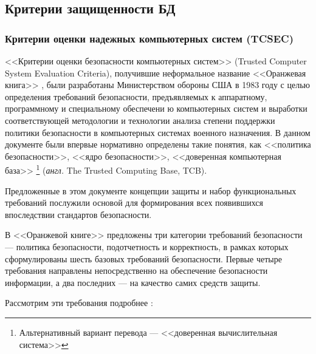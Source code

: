 \subsection{Критерии защищенности БД}

\subsubsection{Критерии оценки надежных компьютерных систем (TCSEC)}
<<Критерии оценки безопасности компьютерных систем>> (Trusted Computer System Evaluation Criteria),
получившие неформальное название <<Оранжевая книга>> \cite{OrangeBook}, были разработаны Министерством обороны
США в 1983 году с целью определения требований безопасности, предъявляемых к аппаратному,
программному и специальному обеспечени	ю компьютерных систем и выработки соответствующей
методологии и технологии анализа степени поддержки политики безопасности в компьютерных
системах военного назначения. В данном документе были впервые нормативно определены такие
понятия, как <<политика безопасности>>, <<ядро безопасности>>, <<доверенная компьютерная база>>
\footnote [1]{ Альтернативный вариант перевода --- <<доверенная вычислительная система>> } (\textit{англ.} The Trusted Computing Base, TCB).

Предложенные в этом документе концепции защиты и набор функциональных требований послужили
основой для формирования всех появившихся впоследствии стандартов безопасности.

В <<Оранжевой книге>> предложены три категории требований безопасности --- политика безопасности,
подотчетность и корректность, в рамках которых сформулированы шесть базовых требований безопасности.
Первые четыре требования направлены непосредственно на обеспечение безопасности информации,
а два последних --- на качество самих средств защиты.

Рассмотрим эти требования подробнее \cite{OrangeBook}:

